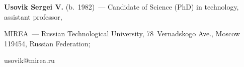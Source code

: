 \vspace*{3pt}



\noindent

\textbf{Usovik Sergei V.} (b.\ 1982)~--- Candidate of Science (PhD) in technology, assistant professor, 

MIREA~--- Russian Technological University, 78~Vernadskogo Ave., Moscow 119454, Russian Federation; 

\mbox{usovik@mirea.ru}



\label{end\stat}



\renewcommand{\bibname}{\protect\rm Литература} 

